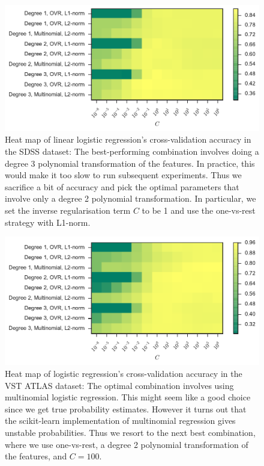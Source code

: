 \begin{figure}[p]
	\centering
	\includegraphics[width=\textwidth]{figures/4_expt1/sdss_grid_logistic}
	\caption[Heat map of logistic regression's CV accuracy in SDSS]{
		Heat map of linear logistic regression's cross-validation accuracy in the SDSS dataset:
		The best-performing combination involves doing a degree 3 polynomial transformation
		of the features. In practice, this would make it too slow to run subsequent experiments.
		Thus we sacrifice a bit of accuracy and pick the optimal parameters that
		involve only a degree 2 polynomial transformation. In particular, we set the inverse regularisation
		term $C$ to be 1 and use the one-vs-rest strategy with L1-norm.}
	\label{fig:sdss_grid_logistic}
\end{figure}

\begin{figure}[p]
	\centering
	\includegraphics[width=\textwidth]{figures/4_expt1/vstatlas_grid_logistic}
	\caption[Heat map of logistic regression's CV accuracy in VST ATLAS]{
		Heat map of logistic regression's cross-validation accuracy in the VST ATLAS dataset:
		The optimal combination involves using multinomial logistic regression. This
		might seem like a good choice since we get true probability estimates. However
		it turns out that the scikit-learn implementation of multinomial regression
		gives unstable probabilities. Thus we resort to the next best combination,
		where we use one-vs-rest, a degree 2 polynomial transformation of the features, and $C = 100$. }
	\label{fig:vstatlas_grid_logistic}
\end{figure}

